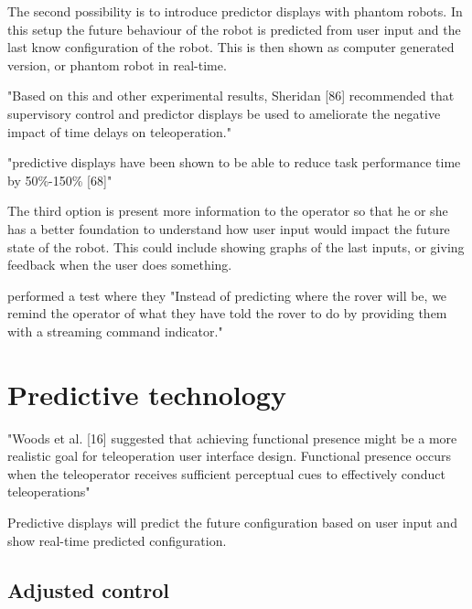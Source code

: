 The second possibility is to introduce predictor displays with phantom robots. In this setup the future behaviour of the robot is predicted from user input and the last know configuration of the robot. This is then shown as computer generated version, or phantom robot in real-time.

\citep{Chen2007} "Based on this and other experimental results, Sheridan [86] recommended that supervisory control and predictor displays be used to ameliorate the negative impact of time delays on teleoperation."

\citep{Chen2007} "predictive displays have been shown to be able to reduce task performance time by 50\%-150\% [68]"

The third option is present more information to the operator so that he or she has a better foundation to understand how user input would impact the future state of the robot. This could include showing graphs of the last inputs, or giving feedback when the user does something.

\citep{Miller2005} performed a test where they "Instead of predicting where the rover will be, we remind the operator of what they have told the rover to do by providing them with a streaming command indicator."

\section{Predictive technology}


\citep{Chen2007} "Woods et al. [16] suggested that achieving functional presence might be a more realistic goal for teleoperation user interface design. Functional presence occurs when the teleoperator receives sufficient perceptual cues to effectively conduct teleoperations"

Predictive displays will predict the future configuration based on user input and show real-time predicted configuration.

\subsection{Adjusted control}

